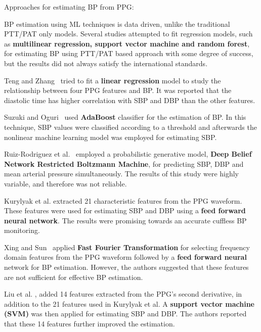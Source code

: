 Approaches for estimating BP from PPG: \newline

BP estimation using ML techniques is data driven, unlike the traditional PTT/PAT only models.
Several studies attempted to fit regression models, such as \textbf{multilinear regression, support vector machine and random forest}, for estimating BP using PTT/PAT based approach with some degree of success, but the results did not always satisfy the international standards.\newline

Teng and Zhang~\cite{tengContinuousNoninvasiveEstimation2003} tried to fit a \textbf{linear regression} model to study the relationship between four PPG features and BP. It was reported that the diastolic time has higher correlation with SBP and DBP than the other features.

Suzuki and Oguri~\cite{suzukiCufflessBloodPressure2009} used \textbf{AdaBoost} classifier for the estimation of BP. In this technique, SBP values were classified according to a threshold and afterwards the nonlinear machine learning model was employed for estimating SBP\@.

Ruiz-Rodriguez et al.~\cite{ruiz-rodriguezInnovativeContinuousNoninvasive2013a} employed a probabilistic generative model, \textbf{Deep Belief Network Restricted Boltzmann Machine}, for predicting SBP, DBP and mean arterial pressure simultaneously.
The results of this study were highly variable, and therefore was not reliable.

Kurylyak et al. \cite{kurylyakNeuralNetworkbasedMethod2013} extracted 21 characteristic features from the PPG waveform.
These features were used for estimating SBP and DBP using a \textbf{feed forward neural network}.
The results were promising towards an accurate cuffless BP monitoring.

Xing and Sun~\cite{xingOpticalBloodPressure2016} applied \textbf{Fast Fourier Transformation} for selecting frequency domain features from the PPG waveform followed by a \textbf{feed forward neural} network for BP estimation.
However, the authors suggested that these features are not sufficient for effective BP estimation.

Liu et al. \cite{liuIntegratedNavigationTethered2017}, added 14 features extracted from the PPG’s second derivative, in addition to the 21 features used in Kurylyak et al.
A \textbf{support vector machine (SVM)} was then applied for estimating SBP and DBP\@.
The authors reported that these 14 features further improved the estimation.\newline

